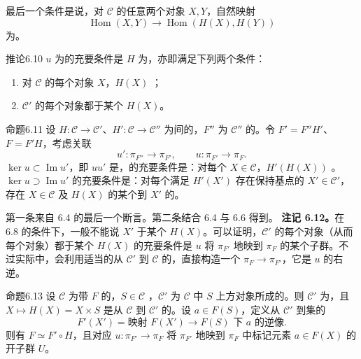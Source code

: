 最后一个条件是说，对 $\mathcal C$ 的任意两个对象 $X,Y$，自然映射
\[\operatorname{Hom}(X,Y)\longrightarrow\operatorname{Hom}(H(X),H(Y))\]
为。
\begin{SGAresult}{推论}{6.10}
$u$ 为的充要条件是 $H$ 为，亦即满足下列两个条件：
\begin{enumerate}\item[a)] 对 $\mathcal C$ 的每个对象 $X$，$H(X)$ ；\item[b)] $\mathcal C'$ 的每个对象都于某个 $H(X)$。
\end{enumerate}
\end{SGAresult}
\begin{SGAresult}{命题}{6.11}
设 $H:\mathcal C\to\mathcal C'$、$H':\mathcal C\to\mathcal C''$ 为间的，$F''$ 为 $\mathcal C''$ 的。令 $F'=F''H'$、$F=F'H$，考虑关联
\[u':\pi_{F''}\longrightarrow\pi_{F'},\qquad u:\pi_{F'}\longrightarrow\pi_F.\]
$\ker u\subset\operatorname{Im}u'$，即 $uu'$ 是，的充要条件是：对每个 $X\in\mathcal C$，$H'(H(X))$ 。$\ker u\supset\operatorname{Im}u'$ 的充要条件是：对每个满足 $H'(X')$ 存在保持基点的 $X'\in\mathcal C'$，存在 $X\in\mathcal C$ 及 $H(X)$ 的某个到 $X'$ 的。
\end{SGAresult}
第一条来自 6.4 的最后一个断言。第二条结合 6.4 与 6.6 得到。
\textbf{注记 6.12。}在 6.8 的条件下，一般不能说 $X'$ 于某个 $H(X)$。可以证明，$\mathcal C'$ 的每个对象（从而每个对象）都于某个 $H(X)$ 的充要条件是 $u$ 将 $\pi_{F'}$ 地映到 $\pi_F$ 的某个子群。不过实际中，会利用适当的从 $\mathcal C'$ 到 $\mathcal C$ 的，直接构造一个 $\pi_F\to\pi_{F'}$，它是 $u$ 的右逆。
\begin{SGAresult}{命题}{6.13}
设 $\mathcal C$ 为带 $F$ 的，$S\in\mathcal C$ ，$\mathcal C'$ 为 $\mathcal C$ 中 $S$ 上方对象所成的。则 $\mathcal C'$ 为，且 $X\mapsto H(X)=X\times S$ 是从 $\mathcal C$ 到 $\mathcal C'$ 的。设 $a\in F(S)$，定义从 $\mathcal C'$ 到集的
\[F'(X')=\text{映射 }F(X')\longrightarrow F(S)\text{ 下 }a\text{ 的逆像}.\]
则有 $F\simeq F'\circ H$，且对应 $u:\pi_{F'}\to\pi_F$ 将 $\pi_{F'}$ 地映到 $\pi_F$ 中标记元素 $a\in F(X)$ 的开子群 $U$。
\end{SGAresult}
